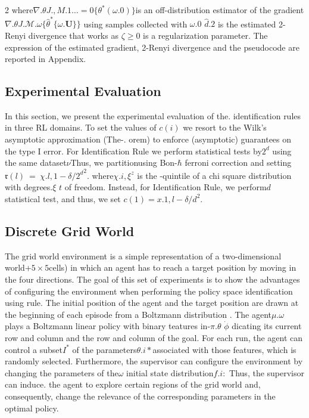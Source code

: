 \documentclass{article}
\begin{document}
\begin{paracol}{2}
where$\nabla . { \theta } J . {, M . { 1 } \dots = 0 } \{ \theta ^ { * } ( \omega . { 0 } ) \}$is an off-distribution estimator of
the gradient$\nabla . { \theta } J . { \mathcal { M } . { \omega } } \{ \hat { \theta } ^ { * } \{ \omega . { \mathbf { U } } \} \}$ using samples collected with
$\omega . { 0 }$ $\hat { d } . { 2 }$ is the estimated 2-Renyi divergence that works as
$\zeta \geqslant 0$
is a regularization parameter. The expression of the estimated gradient, 2-Renyi divergence and the pseudocode are
reported in Appendix.


\subsection*{Experimental Evaluation}


In this section, we present the experimental evaluation of the.
identification rules in three RL domains. To set the values of
$c ( i )$ we resort to the Wilk's asymptotic approximation (The-.
orem) to enforce (asymptotic) guarantees on the type I error. For Identification Rule we perform statistical tests by$2 ^ { d }$
using the same dataset$\nu$Thus, we partitionusing Bon-$\hbar$
ferroni correction and setting$\mathfrak { r } ( l ) ~ = ~ \chi . { l, 1 - \delta / 2 ^ { d } } ^ { 2 }.$ where$\chi . { i, \xi } ^ { z }$
is the -quintile of a chi square distribution with degrees.$\xi$ $t$
of freedom. Instead, for Identification Rule, we perform$d$
statistical test, and thus, we set $c ( 1 ) = x . { 1, l - \delta / d } ^ { 2 }.$


\subsection*{Discrete Grid World}


The grid world environment is a simple representation of a
two-dimensional world+$5 \times 5$cells) in which an agent has to
reach a target position by moving in the four directions. The
goal of this set of experiments is to show the advantages
of configuring the environment when performing the policy space identification using rule. The initial position of the
agent and the target position are drawn at the beginning of
each episode from a Boltzmann distribution . The agent$\mu . { \omega }$
plays a Boltzmann linear policy  with binary teatures in-$\pi . { \theta }$ $\dot { \phi }$
dicating its current row and column and the row and column
of the goal. For each run, the agent can control a subset$I ^ { * }$
of the parameters$\theta . { i * }$associated with those features, which
is randomly selected. Furthermore, the supervisor can configure the environment by changing the parameters  of the$\omega$
initial state distribution$f . { i : }$ Thus, the supervisor can induce.
the agent to explore certain regions of the grid world and,
consequently, change the relevance of the corresponding parameters in the optimal policy.


\end{paracol}
\end{document}
